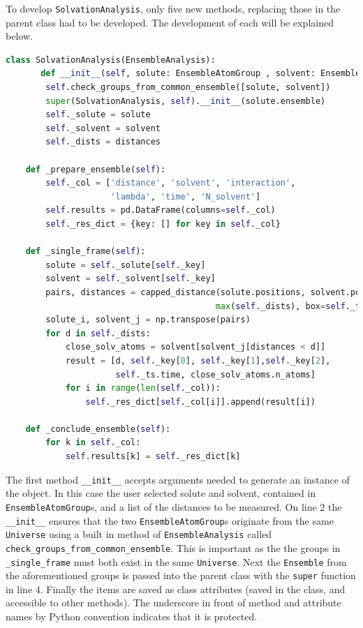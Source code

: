 \documentclass{article}[letterpaper, margins=1in, 12pt]
\begin{document}
To develop \texttt{SolvationAnalysis}, only five new methods, replacing those in the parent class had to be developed. The development of each will be explained below.
\begin{lstlisting}[language=Python]
class SolvationAnalysis(EnsembleAnalysis):
       def __init__(self, solute: EnsembleAtomGroup , solvent: EnsembleAtomGroup , distances: List[float]):
        self.check_groups_from_common_ensemble([solute, solvent])
        super(SolvationAnalysis, self).__init__(solute.ensemble)
        self._solute = solute
        self._solvent = solvent
        self._dists = distances

    def _prepare_ensemble(self):
        self._col = ['distance', 'solvent', 'interaction',
                     'lambda', 'time', 'N_solvent']
        self.results = pd.DataFrame(columns=self._col)
        self._res_dict = {key: [] for key in self._col}

    def _single_frame(self):
        solute = self._solute[self._key]
        solvent = self._solvent[self._key]
        pairs, distances = capped_distance(solute.positions, solvent.positions,
                                          max(self._dists), box=self._ts.dimensions)
        solute_i, solvent_j = np.transpose(pairs)
        for d in self._dists:
            close_solv_atoms = solvent[solvent_j[distances < d]]
            result = [d, self._key[0], self._key[1],self._key[2],
                      self._ts.time, close_solv_atoms.n_atoms]
            for i in range(len(self._col)):
                self._res_dict[self._col[i]].append(result[i])

    def _conclude_ensemble(self):
        for k in self._col:
            self.results[k] = self._res_dict[k]
\end{lstlisting}

The first method \lstinline{__init__} accepts arguments needed to generate an instance of the object. In this case the user selected solute and solvent, contained in \texttt{EnsembleAtomGroup}s, and a list of the distances to be measured. On line 2 the \lstinline{__init__} ensures that the two \texttt{EnsembleAtomGroup}s originate from the same \texttt{Universe} using a built in method of \texttt{EnsembleAnalysis} called \lstinline{check_groups_from_common_ensemble}. This is important as the the groups in \lstinline{_single_frame} must both exist in the same \texttt{Universe}. Next the \texttt{Ensemble} from the aforementioned groups is passed into the parent class with the \lstinline{super} function in line 4. Finally the items are saved as class attributes (saved in the class, and accessible to other methods). The underscore in front of method and attribute names by Python convention indicates that it is protected.
\end{document}
